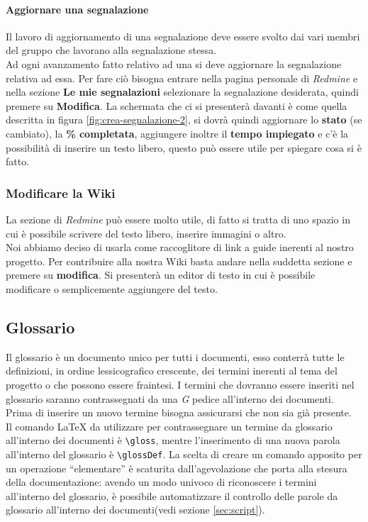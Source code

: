 \documentclass{scalatekids-article}
\begin{document}
\paragraph{Aggiornare una segnalazione}
Il lavoro di aggiornamento di una segnalazione deve essere svolto dai vari membri del gruppo che lavorano alla segnalazione stessa.\\
Ad ogni avanzamento fatto relativo ad una  si deve aggiornare la segnalazione relativa ad essa. Per fare ciò bisogna entrare nella pagina personale di \textit{Redmine} e nella sezione \textbf{Le mie segnalazioni} selezionare la segnalazione desiderata, quindi premere su \textbf{Modifica}.
La schermata che ci si presenterà davanti è come quella descritta in figura \ref{fig:crea-segnalazione-2}, si dovrà quindi aggiornare lo \textbf{stato} (se cambiato), la \textbf{\% completata}, aggiungere inoltre il \textbf{tempo impiegato} e c'è la possibilità di inserire un testo libero, questo può essere utile per spiegare cosa si è fatto.
\subsubsection{Modificare la Wiki}
La sezione  di \textit{Redmine} può essere molto utile, di fatto si tratta di uno spazio in cui è possibile scrivere del testo libero, inserire immagini o altro.\\
Noi abbiamo deciso di usarla come raccoglitore di link a guide inerenti al nostro progetto.
Per contribuire alla nostra Wiki basta andare nella suddetta sezione e premere su \textbf{modifica}. Si presenterà un editor di testo in cui è possibile modificare o semplicemente aggiungere del testo.

\subsection{Glossario}
Il glossario è un documento unico per tutti i documenti, esso conterrà tutte le
definizioni, in ordine lessicografico crescente, dei termini inerenti al tema
del progetto o che possono essere fraintesi. I termini che dovranno essere
inseriti nel glossario saranno contrassegnati da una \textit{G} pedice all'interno dei
documenti. Prima di inserire un nuovo termine bisogna assicurarsi che non sia
già presente.\\ Il comando \LaTeX\xspace da utilizzare per contrassegnare un
termine da glossario all'interno dei documenti è \verb=\gloss=, mentre l'inserimento
di una nuova parola all'interno del glossario è \verb=\glossDef=. La scelta di creare
un comando apposito per un operazione ``elementare'' è scaturita
dall'agevolazione che porta alla stesura della documentazione: avendo un modo
univoco di riconoscere i termini all'interno del glossario, è possibile
automatizzare il controllo delle parole da glossario all'interno dei
documenti(vedi sezione \ref{sec:script}).
\end{document}
